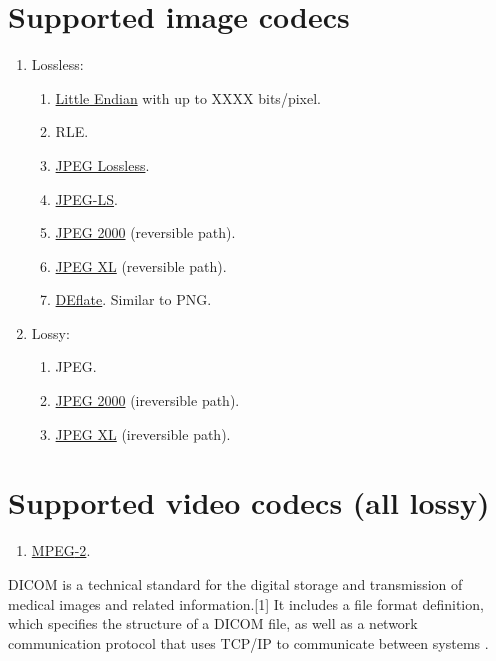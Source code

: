 \section{Supported image codecs}
\begin{enumerate}
\item Lossless:
  \begin{enumerate}
  \item {}
    \href{https://en.wikipedia.org/wiki/Endianness}{Little Endian} with
    up to XXXX bits/pixel.
  \item \gls{RLE}.
  \item \href{https://en.wikipedia.org/wiki/Lossless_JPEG}{JPEG Lossless}.
  \item \href{https://en.wikipedia.org/wiki/Lossless_JPEG\#JPEG_LS}{JPEG-LS}.
  \item \href{https://en.wikipedia.org/wiki/JPEG_2000}{JPEG 2000}
    (reversible path).
  \item \href{https://en.wikipedia.org/wiki/JPEG_XL}{JPEG XL}
    (reversible path).
  \item \href{https://en.wikipedia.org/wiki/Deflate}{DEflate}. Similar
    to \gls{PNG}.
  \end{enumerate}
\item Lossy:
  \begin{enumerate}
  \item \gls{JPEG}.
  \item \href{https://en.wikipedia.org/wiki/JPEG_2000}{JPEG 2000}
    (ireversible path).
  \item \href{https://en.wikipedia.org/wiki/JPEG_XL}{JPEG XL}
    (ireversible path).
  \end{enumerate}
\end{enumerate}

\section{Supported video codecs (all lossy)}
\begin{enumerate}
\item \href{https://en.wikipedia.org/wiki/MPEG-2}{\gls{MPEG}-2}.
\end{enumerate}
  
DICOM is a technical standard for the digital storage and transmission
of medical images and related information.[1] It includes a file
format definition, which specifies the structure of a DICOM file, as
well as a network communication protocol that uses TCP/IP to
communicate between systems \cite{wikipedia2025DICOM}.

